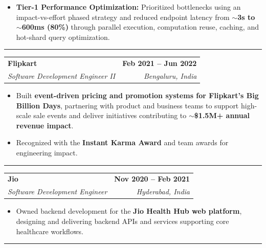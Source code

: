 \documentclass[10pt,a4paper]{article}
\makeatletter
\newcommand{\company}[4]{%
    \begin{tabularx}{\textwidth}{@{}Xr@{}}
        {\large\textbf{#1}} &
        {\small\textbf{#3}} \\[2pt]

        {\textit{\color{secondary}#2}} &
        {\small\textit{\color{secondary}#4}}
    \end{tabularx}
    \vspace{5pt}
}
\newcommand{\companydivider}{%
    \par\vspace{7pt}%
    \noindent
    {\color{companyrule}\rule{\textwidth}{0.35pt}}
    \par
    \vspace{10pt}%
}
\makeatother
\begin{document}
\begin{itemize}
    \item
    \textbf{Tier-1 Performance Optimization:}
    Prioritized bottlenecks using an impact-vs-effort phased strategy and
    reduced endpoint latency from
    \textbf{$\sim$3s to $\sim$600ms (80\%)} through parallel execution,
    computation reuse, caching, and hot-shard query optimization.

\end{itemize}


\newpage

\companydivider


\company
{Flipkart}
{Software Development Engineer II}
{Feb 2021 -- Jun 2022}
{Bengaluru, India}

\begin{itemize}

   \item Built \textbf{event-driven pricing and promotion systems for Flipkart's Big Billion Days}, partnering with product and business teams to support high-scale sale events and deliver initiatives contributing to \textbf{$\sim$\$1.5M+ annual revenue impact}.

    \item
    Recognized with the \textbf{Instant Karma Award} and team awards
    for engineering impact.

\end{itemize}

\companydivider


\company
{Jio}
{Software Development Engineer}
{Nov 2020 -- Feb 2021}
{Hyderabad, India}

\begin{itemize}

    \item
    Owned backend development for the
    \textbf{Jio Health Hub web platform}, designing and delivering
    backend APIs and services supporting core healthcare workflows.

\end{itemize}

\companydivider
\end{document}
